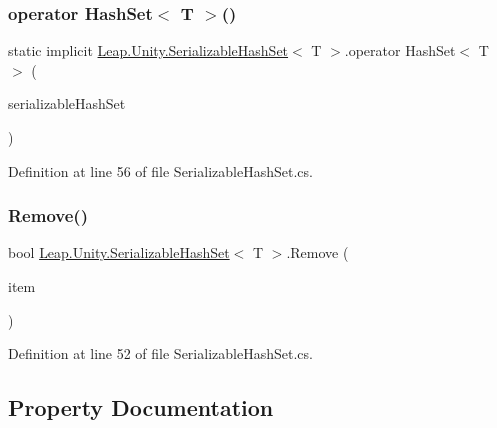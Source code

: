 \subsubsection{\texorpdfstring{operator HashSet$<$ T $>$()}{operator HashSet< T >()}}
{\footnotesize\ttfamily static implicit \mbox{\hyperlink{class_leap_1_1_unity_1_1_serializable_hash_set}{Leap.\+Unity.\+Serializable\+Hash\+Set}}$<$ T $>$.operator Hash\+Set$<$ T $>$ (\begin{DoxyParamCaption}\item[{\mbox{\hyperlink{class_leap_1_1_unity_1_1_serializable_hash_set}{Serializable\+Hash\+Set}}$<$ T $>$}]{serializable\+Hash\+Set }\end{DoxyParamCaption})\hspace{0.3cm}{\ttfamily [static]}}



Definition at line 56 of file Serializable\+Hash\+Set.\+cs.

\mbox{\label{class_leap_1_1_unity_1_1_serializable_hash_set_aa35a7b3cb3fe6ea85546859aded859d9}} 
\subsubsection{\texorpdfstring{Remove()}{Remove()}}
{\footnotesize\ttfamily bool \mbox{\hyperlink{class_leap_1_1_unity_1_1_serializable_hash_set}{Leap.\+Unity.\+Serializable\+Hash\+Set}}$<$ T $>$.Remove (\begin{DoxyParamCaption}\item[{T}]{item }\end{DoxyParamCaption})}



Definition at line 52 of file Serializable\+Hash\+Set.\+cs.



\subsection{Property Documentation}
\mbox{\label{class_leap_1_1_unity_1_1_serializable_hash_set_af3fc7601c948946fedee5d2dfd1cd327}} 
